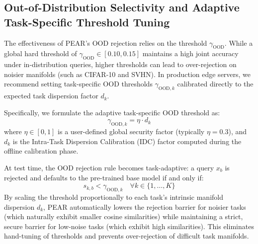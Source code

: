 \documentclass{article}
\theoremstyle{plain}
\theoremstyle{definition}
\theoremstyle{remark}
\begin{document}
\subsection{Out-of-Distribution Selectivity and Adaptive Task-Specific Threshold Tuning}
The effectiveness of PEAR's OOD rejection relies on the threshold $\gamma_{\text{OOD}}$. While a global hard threshold of $\gamma_{\text{OOD}} \in [0.10, 0.15]$ maintains a high joint accuracy under in-distribution queries, higher thresholds can lead to over-rejection on noisier manifolds (such as CIFAR-10 and SVHN). In production edge servers, we recommend setting task-specific OOD thresholds $\gamma_{\text{OOD}, k}$ calibrated directly to the expected task dispersion factor $d_k$. 

Specifically, we formulate the adaptive task-specific OOD threshold as:
\begin{equation}
    \gamma_{\text{OOD}, k} = \eta \cdot d_k
\end{equation}
where $\eta \in [0, 1]$ is a user-defined global security factor (typically $\eta = 0.3$), and $d_k$ is the Intra-Task Dispersion Calibration (IDC) factor computed during the offline calibration phase. 

At test time, the OOD rejection rule becomes task-adaptive: a query $x_b$ is rejected and defaults to the pre-trained base model if and only if:
\begin{equation}
    s_{k, b} < \gamma_{\text{OOD}, k} \quad \forall k \in \{1, \dots, K\}
\end{equation}
By scaling the threshold proportionally to each task's intrinsic manifold dispersion $d_k$, PEAR automatically lowers the rejection barrier for noisier tasks (which naturally exhibit smaller cosine similarities) while maintaining a strict, secure barrier for low-noise tasks (which exhibit high similarities). This eliminates hand-tuning of thresholds and prevents over-rejection of difficult task manifolds.
\end{document}
